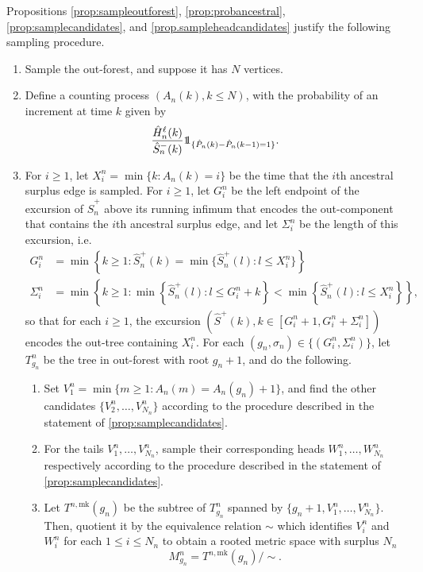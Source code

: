 Propositions \ref{prop:sampleoutforest}, \ref{prop:probancestral}, \ref{prop:samplecandidates}, and \ref{prop.sampleheadcandidates} justify the following sampling procedure.
\begin{enumerate}
    \item Sample the out-forest, and suppose it has $N$ vertices.
    \item Define a counting process $(A_n(k),k\leq N)$, with the probability of an increment at time $k$ given by $$\frac{\hat{H}_n^\ell(k)}{\hat{S}_n^-(k)}\one_{\{\hat{P}_n(k)-\hat{P}_n(k-1)=1\}}.$$
    \item For $i\geq 1$, let $X_i^n=\min\{k:A_n(k)=i\}$ be the time that the $i$th ancestral surplus edge is sampled. For $i\geq 1$, let $G_i^n$ be the left endpoint of the excursion of $\hat{S}^{+}_n$ above its running infimum that encodes the out-component that contains the $i$th ancestral surplus edge, and let $\Sigma_i^n$ be the length of this excursion, i.e. 
\begin{align*}G_i^n&=\min\left\{k\geq 1:\hat{S}^{+}_n(k)=\min\{\hat{S}^{+}_n(l):l\leq X_i^n\}\right\}\\
\Sigma_i^n&=\min\left\{k \geq 1: \min\left\{\hat{S}^{+}_n(l):l\leq G_i^n+k\right\} < \min\left\{\hat{S}^{+}_n(l):l\leq X_i^n\right\}\right\},
\end{align*}
so that for each $i\geq 1$, the excursion $\left(\hat{S}^+(k),k\in [G_i^n+1,G_i^n+\Sigma_i^n]\right)$ encodes the out-tree containing $X_i^n$. For each $(g_n,\sigma_n)\in \{(G_i^n,\Sigma_i^n)\}$, let $T^n_{g_n}$ be the tree in out-forest with root $g_n+1$, and do the following.
    \begin{enumerate}
    \item \label{item.procedure3} Set $V_1^n=\min\{m\geq 1:A_n(m)=A_n(g_n)+1\}$, and find the other candidates $\{V_2^n,\dots ,V_{N_n}^n\}$ according to the procedure described in the statement of \cref{prop:samplecandidates}.
    \item \label{item.procedure4} For the tails $V_1^n,\dots, V_{N_n}^n$, sample their corresponding heads $W_1^n,\dots ,W_{N_n}^n$ respectively according to the procedure described in the statement of \cref{prop:samplecandidates}.
    \item Let $T^{n,\mathrm{mk}}(g_n)$ be the subtree of $T^n_{g_n}$ spanned by $\{g_n+1,V_1^n,\dots ,V_{N_n}^n\}$. Then, quotient it by the equivalence relation $\sim$ which identifies $V_i^n$ and $W_i^n$ for each $1\leq i\leq N_n$ to obtain a rooted metric space with surplus $N_n$ $$M^n_{g_n}=T^{n,\mathrm{mk}}(g_n)/\sim.$$ 
\end{enumerate}
\end{enumerate}
